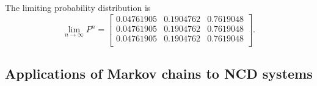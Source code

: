 \documentclass[
]{book}
\theoremstyle{definition}
\theoremstyle{definition}
\theoremstyle{definition}
\theoremstyle{definition}
\theoremstyle{remark}
\begin{document}
The limiting probability distribution is
\[\lim_{n\rightarrow \infty} P^n=
 \begin{bmatrix}
0.04761905 & 0.1904762 & 0.7619048\\
0.04761905 & 0.1904762 & 0.7619048\\
0.04761905 & 0.1904762 & 0.7619048\\
\end{bmatrix}.\]

\hypertarget{applications-of-markov-chains-to-ncd-systems}{%
\subsection*{Applications of Markov chains to NCD systems}\label{applications-of-markov-chains-to-ncd-systems}}
\end{document}
